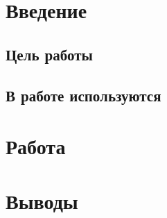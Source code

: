 \documentclass{article}
\author{Александр Романов Б01-107}
\date{}
\title{}
\begin{document}
\maketitle
\section{Введение}
\subsection{Цель работы}

\subsection{В работе используются}
\section{Работа}
\section{Выводы}
\end{document}
